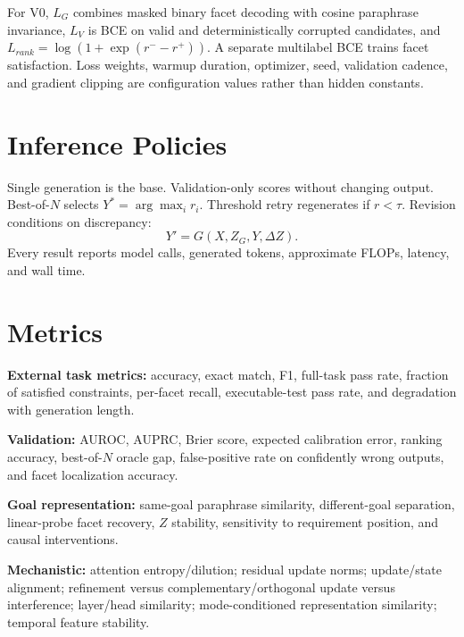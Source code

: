 \documentclass[11pt]{article}
\begin{document}
For V0, $L_G$ combines masked binary facet decoding with cosine paraphrase invariance, $L_V$ is BCE on valid and deterministically corrupted candidates, and $L_{rank}=\log(1+\exp(r^- - r^+))$. A separate multilabel BCE trains facet satisfaction. Loss weights, warmup duration, optimizer, seed, validation cadence, and gradient clipping are configuration values rather than hidden constants.

\section{Inference Policies}
Single generation is the base. Validation-only scores without changing output. Best-of-$N$ selects $Y^*=\arg\max_i r_i$. Threshold retry regenerates if $r<\tau$. Revision conditions on discrepancy:
\begin{equation}
Y'=G(X,Z_G,Y,\Delta Z).
\end{equation}
Every result reports model calls, generated tokens, approximate FLOPs, latency, and wall time.

\section{Metrics}
\textbf{External task metrics:} accuracy, exact match, F1, full-task pass rate, fraction of satisfied constraints, per-facet recall, executable-test pass rate, and degradation with generation length.

\textbf{Validation:} AUROC, AUPRC, Brier score, expected calibration error, ranking accuracy, best-of-$N$ oracle gap, false-positive rate on confidently wrong outputs, and facet localization accuracy.

\textbf{Goal representation:} same-goal paraphrase similarity, different-goal separation, linear-probe facet recovery, $Z$ stability, sensitivity to requirement position, and causal interventions.

\textbf{Mechanistic:} attention entropy/dilution; residual update norms; update/state alignment; refinement versus complementary/orthogonal update versus interference; layer/head similarity; mode-conditioned representation similarity; temporal feature stability.
\end{document}
